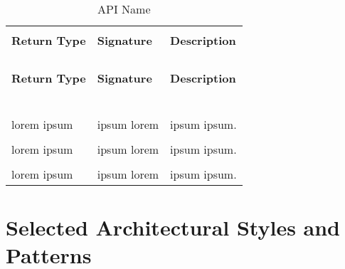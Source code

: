 \begin{longtable}{p{}p{}p{}}
    \caption{API Name}
    \vspace{0.5em}\\
    \hline
    \vspace{0.5em}\\
    \textbf{Return Type} & \textbf{Signature} & \textbf{Description} \\
    \vspace{0.5em}\\
    \hline
    \vspace{0.5em}\\
    \endfirsthead
    \vspace{0.5em}\\
    \hline
    \vspace{0.5em}\\
    \textbf{Return Type} & \textbf{Signature} & \textbf{Description} \\
    \vspace{0.5em}\\
    \hline
    \vspace{0.5em}\\
    \endhead
    
    \vspace{0.5em}\\
    \hline
    \vspace{0.5em}\\
    \endfoot
    
    \vspace{0.5em}\\
    \hline
    \vspace{0.5em}\\
    \endlastfoot
    
    lorem ipsum &
    ipsum lorem &
    ipsum ipsum. \\
    \vspace{0.5em}\\
    lorem ipsum &
    ipsum lorem &
    ipsum ipsum. \\
    \vspace{0.5em}\\
    lorem ipsum &
    ipsum lorem &
    ipsum ipsum. \\

\end{longtable}

\section{Selected Architectural Styles and Patterns}

